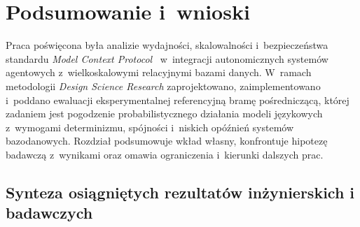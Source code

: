\chapter{Podsumowanie i~wnioski}
\label{chap:podsumowanie}

Praca poświęcona była analizie wydajności, skalowalności i~bezpieczeństwa standardu \emph{Model Context Protocol}~\cite{mcp_spec} w~integracji autonomicznych systemów agentowych z~wielkoskalowymi relacyjnymi bazami danych. W~ramach metodologii \emph{Design Science Research} zaprojektowano, zaimplementowano i~poddano ewaluacji eksperymentalnej referencyjną bramę pośredniczącą, której zadaniem jest pogodzenie probabilistycznego działania modeli językowych z~wymogami determinizmu, spójności i~niskich opóźnień systemów bazodanowych. Rozdział podsumowuje wkład własny, konfrontuje hipotezę badawczą z~wynikami oraz omawia ograniczenia i~kierunki dalszych prac.


\section{Synteza osiągniętych rezultatów inżynierskich i badawczych}
\label{sec:podsumowanie_synteza}

